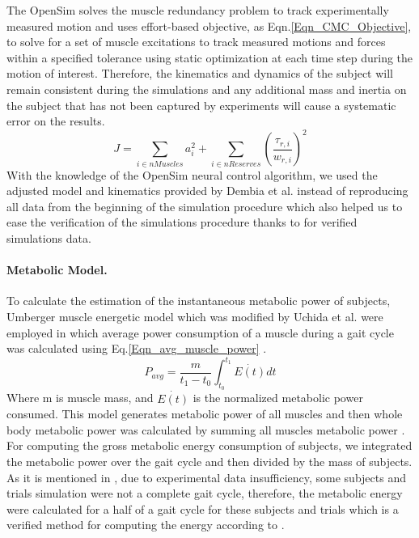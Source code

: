 \documentclass[10pt,letterpaper]{article}
\begin{document}
The OpenSim solves the muscle redundancy problem to track experimentally measured motion and uses effort-based objective, as Eqn.\eqref{Eqn_CMC_Objective}, to solve for a set of muscle excitations to track measured motions and forces within a specified tolerance using static optimization at each time step during the motion of interest\cite{92}. Therefore, the kinematics and dynamics of the subject will remain consistent during the simulations and any additional mass and inertia on the subject that has not been captured by experiments will cause a systematic error on the results.\\
\begin{equation}\label{Eqn_CMC_Objective}
J = \sum_{i\in nMuscles} a_{i}^{2} + \sum_{i \in nReserves} (\frac{\tau_{r,i}}{w_{r,i}})^2
\end{equation}
With the knowledge of the OpenSim neural control algorithm, we used the adjusted model and kinematics provided by Dembia et al.\cite{93} instead of reproducing all data from the beginning of the simulation procedure which also helped us to ease the verification of the simulations procedure thanks to \cite{93} for verified simulations data.\\
\paragraph*{Metabolic Model.} To calculate the estimation of the instantaneous metabolic power of subjects, Umberger \cite{105} muscle energetic model which was modified by Uchida et al. \cite{106}  were employed in which average power consumption of a muscle during a gait cycle was calculated using Eq.\eqref{Eqn_avg_muscle_power} \cite{106}.\\
\begin{equation}\label{Eqn_avg_muscle_power}
	P_{avg} = \frac{m}{t_1 - t_0}\int_{t_0}^{t_1} \dot{E(t)} dt
\end{equation}
Where m is muscle mass, and $\dot{E(t)}$ is the normalized metabolic power consumed. This model generates metabolic power of all muscles and then whole body metabolic power was calculated by summing all muscles metabolic power \cite{106}. For computing the gross metabolic energy consumption of subjects, we integrated the metabolic power over the gait cycle and then divided by the mass of subjects.\\
As it is mentioned in \cite{93}, due to experimental data insufficiency, some subjects and trials simulation were not a complete gait cycle, therefore, the metabolic energy were calculated for a half of a gait cycle for these subjects and trials which is a verified method for computing the energy according to \cite{93}. \\
\end{document}
